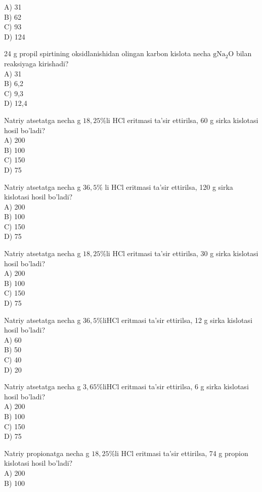 A) 31\\
B) 62\\
C) 93\\
D) 124
  \item 24 g propil spirtining oksidlanishidan olingan karbon kislota necha $\mathrm{g} \mathrm{Na}_{2} \mathrm{O}$ bilan reaksiyaga kirishadi?\\
A) 31\\
B) 6,2\\
C) 9,3\\
D) 12,4
  \item Natriy atsetatga necha g $18,25 \% \mathrm{li}$ HCl eritmasi ta'sir ettirilsa, 60 g sirka kislotasi hosil bo'ladi?\\
A) 200\\
B) 100\\
C) 150\\
D) 75
  \item Natriy atsetatga necha g $36,5 \%$ li HCl eritmasi ta'sir ettirilsa, 120 g sirka kislotasi hosil bo'ladi?\\
A) 200\\
B) 100\\
C) 150\\
D) 75
  \item Natriy atsetatga necha g $18,25 \% \mathrm{li}$ HCl eritmasi ta'sir ettirilsa, 30 g sirka kislotasi hosil bo'ladi?\\
A) 200\\
B) 100\\
C) 150\\
D) 75
  \item Natriy atsetatga necha g $36,5 \% \mathrm{li} \mathrm{HCl}$ eritmasi ta'sir ettirilsa, 12 g sirka kislotasi hosil bo'ladi?\\
A) 60\\
B) 50\\
C) 40\\
D) 20
  \item Natriy atsetatga necha g $3,65 \% \mathrm{li} \mathrm{HCl}$ eritmasi ta'sir ettirilsa, 6 g sirka kislotasi hosil bo'ladi?\\
A) 200\\
B) 100\\
C) 150\\
D) 75
  \item Natriy propionatga necha g $18,25 \% \mathrm{li}$ HCl eritmasi ta'sir ettirilsa, 74 g propion kislotasi hosil bo'ladi?\\
A) 200\\
B) 100\\
